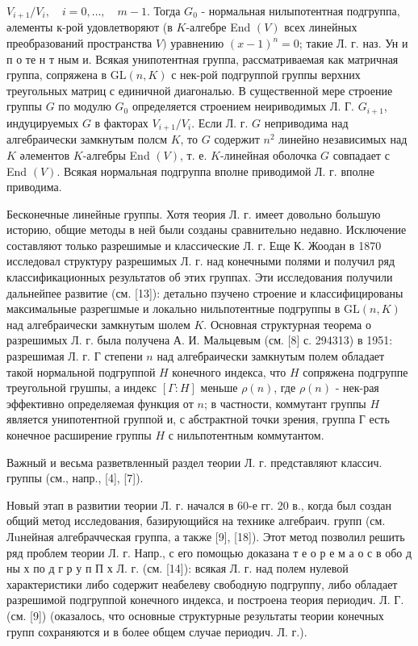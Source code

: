 \documentclass[10pt]{article}
\begin{document}
$V_{i+1} / V_{i}, \quad i=0, \ldots, \quad m-1$. Тогда $G_{0}$ - нормальная нилыпотентная подгруппа, әлементы к-рой удовлетворяют (в $K$-алгебре End $(V)$ всех линейных преобразований пространства $V)$ уравнению $(x-1)^{n}=0$; такие Л. г. наз. Ун и п о те н т ным и. Всякая унипотентная группа, рассматриваемая как матричная группа, сопряжена в $\mathrm{GL}(n, K)$ с нек-рой подгруппой группы верхних треугольных матриц с единичной диагональю. В существенной мере строение группы $G$ по модулю $G_{0}$ определяется строением неириводимых Л. Г. $G_{i+1}$, индуцируемых $G$ в факторах $V_{i+1} / V_{i}$. Если Л. г. $G$ неприводима над алгебраически замкнутым полсм $K$, то $G$ содержит $n^{2}$ линейно независимых над $K$ әлементов $K$-алгебры End $(V)$, т. е. $K$-линейная оболочка $G$ совпадает с End $(V)$. Всякая нормальная подгруппа вполне приводимой Л. г. вполне приводима.



Бесконечные линейные группы. Хотя теория Л. г. имеет довольно большую историю, общие методы в ней были созданы сравнительно недавно. Исключение составляют только разрешимые и классические Л. г. Еще К. Жоодан в 1870 исследовал структуру разрешимых Л. г. над конечными полями и получил ряд классификационных результатов об этих группах. Эти исследования получили дальнейпее развитие (см. [13]): детально пзучено строение и классифицированы максимальные разрегшмые и локально нильпотентные подгруппы в $\mathrm{GL}(n, K)$ над алгебраически замкнутым шолем $K$. Основная структурная теорема о разрешимых Л. г. была получена А. И. Мальцевым (см. [8] с. 294313) в 1951: разрешимая Л. г. Г степени $n$ над алгебраически замкнутым полем обладает такой нормальной подгруппой $H$ конечного индекса, что $H$ сопряжена подгруппе треугольной грушпы, а индекс $[\Gamma: H]$ меньше $\rho(n)$, где $\rho(n)$ - нек-рая эффективно определяемая функция от $n$; в частности, коммутант группы $H$ является унипотентной группой и, с абстрактной точки зрения, группа Г есть конечное расширение группы $H$ с нильпотентным коммутантом.



Важный и весьма разветвленный раздел теории Л. г. представляют классич. группы (см., напр., [4], [7]).



Новый этап в развитии теории Л. г. начался в 60-е гг. 20 в., когда был создан общий метод исследования, базирующийся на технике алгебраич. групп (см. Лuнейная алгебрачческая группа, а также [9], [18]). Этот метод позволил решить ряд проблем теории Л. г. Напр., с его помощью доказана т е о р е м а о с в обо д ны х по д г р у п П х Л. г. (см. [14]): всякая Л. г. над полем нулевой характеристики либо содержит неабелеву свободную подгруппу, либо обладает разрешимой подгруппой конечного индекса, и построена теория периодич. Л. Г. (см. [9]) (оказалось, что основные структурные результаты теории конечных групп сохраняются и в более общем случае периодич. Л. г.).
\end{document}
